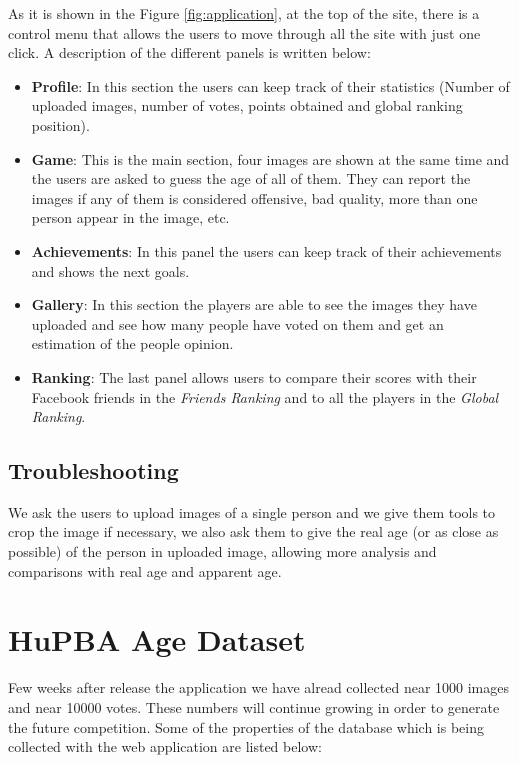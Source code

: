 As it is shown in the Figure \ref{fig:application}, at the top of the site, there is a control menu that allows the users to move through all the site with just one click. A description of the different panels is written below:

\begin{itemize}
	\item \textbf{Profile}: In this section the users can keep track of their statistics (Number of uploaded images, number of votes, points obtained and global ranking position).
	\item \textbf{Game}: This is the main section, four images are shown at the same time and the users are asked to guess the age of all of them. They can report the images if any of them is considered offensive, bad quality, more than one person appear in the image, etc.
	\item \textbf{Achievements}: In this panel the users can keep track of their achievements and shows the next goals.
	\item \textbf{Gallery}: In this section the players are able to see the images they have uploaded and see how many people have voted on them and get an estimation of the people opinion.
	\item \textbf{Ranking}:	The last panel allows users to compare their scores with their Facebook friends in the \textit{Friends Ranking} and to all the players in the \textit{Global Ranking}.
\end{itemize}

\subsection{Troubleshooting}\label{sec:trouble}
We ask the users to upload images of a single person and we give them tools to crop the image if necessary, we also ask them to give the real age (or as close as possible) of the person in uploaded image, allowing more analysis and comparisons with real age and apparent age.


\section{HuPBA Age Dataset}

Few weeks after release the application we have alread collected near 1000 images and near 10000 votes. These numbers will continue growing in order to generate the future competition. Some of the properties of the database which is being collected with the web application are listed below:

